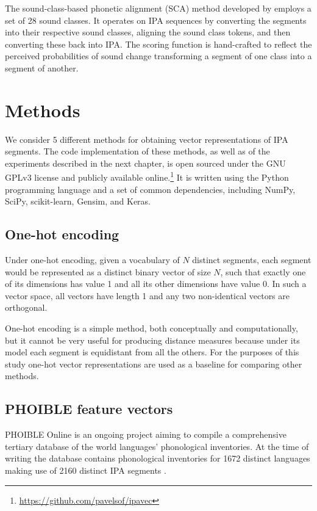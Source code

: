 \documentclass[a4paper]{report}
\begin{document}
The sound-class-based phonetic alignment (SCA) method developed by \citet{2012_List} employs a set of 28 sound classes.
It operates on IPA sequences by converting the segments into their respective sound classes, aligning the sound class tokens, and then converting these back into IPA.
The scoring function is hand-crafted to reflect the perceived probabilities of sound change transforming a segment of one class into a segment of another.


\chapter{Methods}

We consider 5 different methods for obtaining vector representations of IPA segments.
The code implementation of these methods, as well as of the experiments described in the next chapter,
is open sourced under the GNU GPLv3 license and publicly available online.\footnote{\url{https://github.com/pavelsof/ipavec}}
It is written using the Python programming language and a set of common dependencies, including NumPy, SciPy, scikit-learn, Gensim, and Keras.


\section{One-hot encoding}

Under one-hot encoding, given a vocabulary of $N$ distinct segments, each segment would be represented as a distinct binary vector of size $N$,
such that exactly one of its dimensions has value 1 and all its other dimensions have value 0.
In such a vector space, all vectors have length 1 and any two non-identical vectors are orthogonal.

One-hot encoding is a simple method, both conceptually and computationally, but it cannot be very useful for producing distance measures
because under its model each segment is equidistant from all the others.
For the purposes of this study one-hot vector representations are used as a baseline for comparing other methods.


\section{PHOIBLE feature vectors}

PHOIBLE Online is an ongoing project aiming to compile a comprehensive tertiary database of the world languages' phonological inventories.
At the time of writing the database contains phonological inventories for 1672 distinct languages making use of 2160 distinct IPA segments \citep{2014_Moran_al}.
\end{document}
